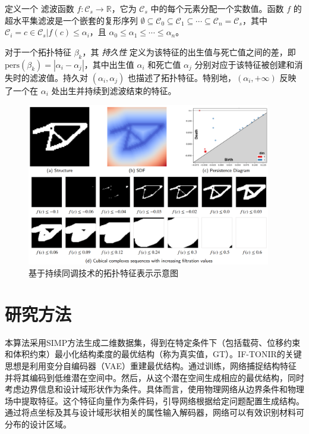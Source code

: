 \begin{definition}
    \label{def:filtration}
    定义一个 滤波函数 $f:\mathcal{C}_s\rightarrow\mathbb{R}$，它为 $\mathcal{C}_s$ 中的每个元素分配一个实数值。函数 $f$ 的超水平集滤波是一个嵌套的复形序列 $\emptyset\subseteq\mathcal{C}_0\subseteq\mathcal{C}_1\subseteq\cdots\subseteq\mathcal{C}_n=\mathcal{C}_s$，其中 $\mathcal{C}_i={c\in\mathcal{C}_s|f(c)\leq\alpha_i}$，且 $\alpha_0\leq\alpha_1\leq\cdots\leq\alpha_n$。
\end{definition}

\begin{definition}
    \label{def:persistence}
    对于一个拓扑特征 $\beta_k$，其 \textit{持久性} 定义为该特征的出生值与死亡值之间的差，即 $\text{pers}(\beta_k)=|\alpha_i-\alpha_j|$，其中出生值 $\alpha_i$ 和死亡值 $\alpha_j$ 分别对应于该特征被创建和消失时的滤波值。持久对 $(\alpha_i, \alpha_j)$ 也描述了拓扑特征。特别地，$(\alpha_i, +\infty)$ 反映了一个在 $\alpha_i$ 处出生并持续到滤波结束的特征。
\end{definition}

\begin{figure}[htbp]
    \centering
    \includegraphics[width=0.95\textwidth]{./figures/TONIR/topo-PD-illu}
    \caption{基于持续同调技术的拓扑特征表示示意图}
    \label{fig:ph-illu}
\end{figure}

\section{研究方法}
本算法采用SIMP方法生成二维数据集，得到在特定条件下（包括载荷、位移约束和体积约束）最小化结构柔度的最优结构（称为真实值，GT）。IF-TONIR的关键思想是利用变分自编码器（VAE）重建最优结构。通过训练，网络捕捉结构特征并将其编码到低维潜在空间中。然后，从这个潜在空间生成相应的最优结构，同时考虑边界信息和设计域形状作为条件。具体而言，使用物理网络从边界条件和物理场中提取特征。这个特征向量作为条件码，引导网络根据给定问题配置生成结构。通过将点坐标及其与设计域形状相关的属性输入解码器，网络可以有效识别材料可分布的设计区域。

